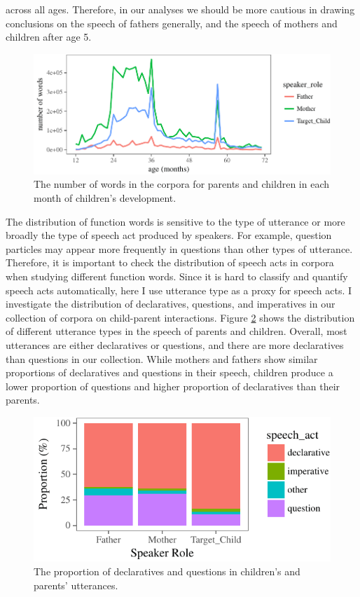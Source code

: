 \documentclass[oneside]{report}
\theoremstyle{definition}
\theoremstyle{definition}
\theoremstyle{definition}
\theoremstyle{remark}
\begin{document}
across all ages. Therefore, in our analyses we should be more cautious
in drawing conclusions on the speech of fathers generally, and the
speech of mothers and children after age 5.
\begin{figure}[tb]

{\centering \includegraphics{figs/wordsByAge-1} 

}

\caption{The number of words in the corpora for parents and children in each month of children's development.}\label{fig:wordsByAge}
\end{figure}
The distribution of function words is sensitive to the type of utterance
or more broadly the type of speech act produced by speakers. For
example, question particles may appear more frequently in questions than
other types of utterance. Therefore, it is important to check the
distribution of speech acts in corpora when studying different function
words. Since it is hard to classify and quantify speech acts
automatically, here I use utterance type as a proxy for speech acts. I
investigate the distribution of declaratives, questions, and imperatives
in our collection of corpora on child-parent interactions. Figure
\ref{fig:totalUtteranceTypePlot} shows the distribution of different
utterance types in the speech of parents and children. Overall, most
utterances are either declaratives or questions, and there are more
declaratives than questions in our collection. While mothers and fathers
show similar proportions of declaratives and questions in their speech,
children produce a lower proportion of questions and higher proportion
of declaratives than their parents.
\begin{figure}[tb]

{\centering \includegraphics{figs/totalUtteranceTypePlot-1} 

}

\caption{The proportion of declaratives and questions in children's and parents' utterances.}\label{fig:totalUtteranceTypePlot}
\end{figure}
\end{document}
